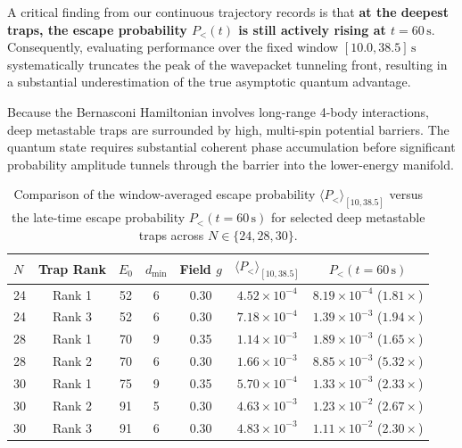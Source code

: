 A critical finding from our continuous trajectory records is that \textbf{at the deepest traps, the escape probability $P_<(t)$ is still actively rising at $t = 60\,\text{s}$}. Consequently, evaluating performance over the fixed window $[10.0, 38.5]\,\text{s}$ systematically truncates the peak of the wavepacket tunneling front, resulting in a substantial underestimation of the true asymptotic quantum advantage.

Because the Bernasconi Hamiltonian involves long-range 4-body interactions, deep metastable traps are surrounded by high, multi-spin potential barriers. The quantum state requires substantial coherent phase accumulation before significant probability amplitude tunnels through the barrier into the lower-energy manifold. 

\begin{table}[h]
\centering
\small
\caption{Comparison of the window-averaged escape probability $\langle P_< \rangle_{[10, 38.5]}$ versus the late-time escape probability $P_<(t = 60\,\text{s})$ for selected deep metastable traps across $N \in \{24, 28, 30\}$.}
\label{tab:window_underestimation}
\begin{tabular}{lcccccc}
\toprule
$N$ & Trap Rank & $E_0$ & $d_{\min}$ & Field $g$ & $\langle P_< \rangle_{[10, 38.5]}$ & $P_<(t = 60\,\text{s})$ \\
\midrule
24 & Rank 1 & 52 & 6 & 0.30 & $4.52 \times 10^{-4}$ & $8.19 \times 10^{-4}$ ($1.81\times$) \\
24 & Rank 3 & 52 & 6 & 0.30 & $7.18 \times 10^{-4}$ & $1.39 \times 10^{-3}$ ($1.94\times$) \\
28 & Rank 1 & 70 & 9 & 0.35 & $1.14 \times 10^{-3}$ & $1.89 \times 10^{-3}$ ($1.65\times$) \\
28 & Rank 2 & 70 & 6 & 0.30 & $1.66 \times 10^{-3}$ & $8.85 \times 10^{-3}$ ($5.32\times$) \\
30 & Rank 1 & 75 & 9 & 0.35 & $5.70 \times 10^{-4}$ & $1.33 \times 10^{-3}$ ($2.33\times$) \\
30 & Rank 2 & 91 & 5 & 0.30 & $4.63 \times 10^{-3}$ & $1.23 \times 10^{-2}$ ($2.67\times$) \\
30 & Rank 3 & 91 & 6 & 0.30 & $4.83 \times 10^{-3}$ & $1.11 \times 10^{-2}$ ($2.30\times$) \\
\bottomrule
\end{tabular}
\end{table}

